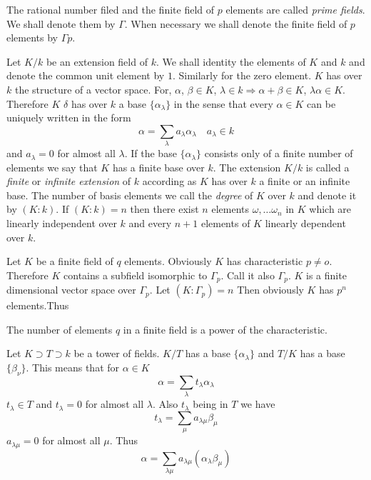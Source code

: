 The rational number filed and the finite field of $p$ elements are
called \textit{prime fields}. We shall denote them by $\Gamma$. When
necessary we shall denote the finite field of $p$ elements by $\Gamma p$. 

Let $K/k$ be an extension field of $k$. We shall identity the
elements of $K$ and $k$ and denote the common unit element by
$1$. Similarly for the zero element. $K$ has over $k$ the structure of
a vector space. For, $\alpha$, $\beta \in K$, $\lambda \in k
\Longrightarrow \alpha + \beta \in K$, $\lambda \alpha \in
K$. Therefore $K$ $\delta$ has over $k$ a base $\{\alpha_\lambda
\}$ in the sense that every $\alpha \in K$ can be uniquely written in
the form 
$$
\alpha = \sum_{\lambda} a_{\lambda} \alpha_{\lambda} \quad 
       {a_{\lambda}} \in k 
$$
and $a_{\lambda} = 0 $ for almost all $\lambda$. If the base $\{
\alpha_{\lambda}\}$ consists only of a finite number of elements we
say that $K$ has a finite base over $k$. The extension $K/k$ is called
a \textit{finite} or \textit{infinite extension} of $k$ according as
$K$ has over $k$ a finite or an infinite base. The number of basis
elements we call the \textit{degree} of $K$ over $k$ and denote it by
$(K : k)$. If $(K : k) =n$ then there exist $n$ elements $\omega ,
\ldots \omega_n$ in $K$ which are linearly independent over $k$ and
every $n +1$ elements of $K$ linearly dependent over $k$. 

Let $K$ be a finite field of $q$ elements. Obviously $K$ has
characteristic $p \neq o$. Therefore $K$ contains a subfield
isomorphic to $\Gamma _p$. Call it also $\Gamma_p$. $K$ is a finite
dimensional vector space over $\Gamma_p$. Let $(K : \Gamma_p)=n$ Then
obviously $K$ has $p^n$ elements.\pageoriginale Thus  


\begin{thm}\label{c1:thm2}%
The number of elements $q$ in a finite field is a power of the
  characteristic. 
\end{thm}

Let $K \supset T \supset k$ be a tower of fields. $K/ T$ has a base
$\{\alpha _{\lambda}\}$ and $T/K$ has a base
$\{\beta_{\nu}\}$. This means that for $\alpha \in K$  
$$
\alpha = \sum_{\lambda} t_{\lambda} \alpha_{\lambda}
$$
$t_ \lambda \in T$ and $ t_\lambda =0$ for almost all $\lambda$. Also
$t_{\lambda}$ being in $T$ we have 
$$ 
t_{\lambda}= \sum_{\mu} a_{\lambda \mu} \beta_{\mu}
$$ 
$a_{\lambda \mu} =0$ for almost all $\mu$. Thus
$$
\alpha = \sum_{\lambda \mu} a_{\lambda \mu} (\alpha_{\lambda} 
\beta_{\mu}) 
$$

